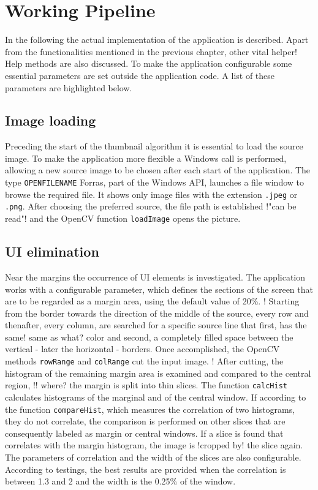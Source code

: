 \documentclass[draft,final]{vutinfth} %
\begin{document}
	\section{Working Pipeline}
	In the following the actual implementation of the application is described.
	Apart from the functionalities mentioned in the previous chapter, other vital helper! Help methods are also discussed.
	To make the application configurable some essential parameters are set outside the application code. 
	A list of these parameters are highlighted below.
	
	\subsection{Image loading}
	Preceding the start of the thumbnail algorithm it is essential to load the source image.
	To make the application more flexible a Windows call is performed, allowing a new source image to be chosen after each start of the application.
	The type \texttt{OPENFILENAME} Forras, part of the Windows API, launches a file window to browse the required file.
	It shows only image files with the extension \texttt{.jpeg} or \texttt{.png}.
	After choosing the preferred source, the file path is established !"can be read"! and the OpenCV function \texttt{loadImage} opens the picture.
	
	\subsection{UI elimination}
	Near the margins the occurrence of UI elements is investigated.
	The application works with a configurable parameter, which defines the sections of the screen that are to be regarded as a margin area, using the default value of 20\%. 
	! Starting from the border towards the direction of the middle of the source, every row and thenafter, every column, are searched for a specific source line that first, has the same! same as what? color and second, a completely filled space between the vertical - later the horizontal - borders.
	Once accomplished, the OpenCV methods \texttt{rowRange} and \texttt{colRange} cut the input image.
	! After cutting, the histogram of the remaining margin area is examined and compared to the central region, !! where? the margin is split into thin slices.
	The function \texttt{calcHist} calculates histograms of the marginal and of the central window.
	If according to the function \texttt{compareHist}, which measures the correlation of two histograms,%
	they do not correlate, the comparison is performed on other slices that are consequently labeled as margin or central windows.
	If a slice is found that correlates with the margin histogram, the image is !cropped by! the slice again. 
	The parameters of correlation and the width of the slices are also configurable.
	According to testings, the best results are provided when the correlation is between 1.3 and 2 and the width is the 0.25\% of the window.
	
\end{document}
